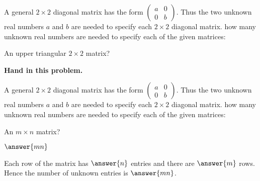 \documentclass{ximera}
\begin{document}



\problemlabel

\noindent A general $2\times 2$ diagonal matrix has the form $\left(\begin{array}{rr} a & 0 \\ 0 & b\end{array}\right)$.  Thus the two unknown real numbers $a$ and $b$ are needed to specify each $2\times 2$ diagonal matrix.  how many unknown real numbers are needed to specify each of the given matrices:

\begin{exercise}  \label{c1.3.1a}
An upper triangular $2\times 2$ matrix? %

{\center\bf Hand in this problem.}

%
\end{exercise}





\problemlabel

\noindent A general $2\times 2$ diagonal matrix has the form $\left(\begin{array}{rr} a & 0 \\ 0 & b\end{array}\right)$.  Thus the two unknown real numbers $a$ and $b$ are needed to specify each $2\times 2$ diagonal matrix.  how many unknown real numbers are needed to specify each of the given matrices:

\begin{exercise}  \label{c1.3.2}
An $m\times n$ matrix? \begin{prompt}$\answer{mn}$\end{prompt}

\begin{solution}
Each row of the matrix has $\answer{n}$ entries and there are $\answer{m}$ rows.  Hence the number of unknown entries is $\answer{mn}$.

\end{solution}
\end{exercise}
\end{document}
